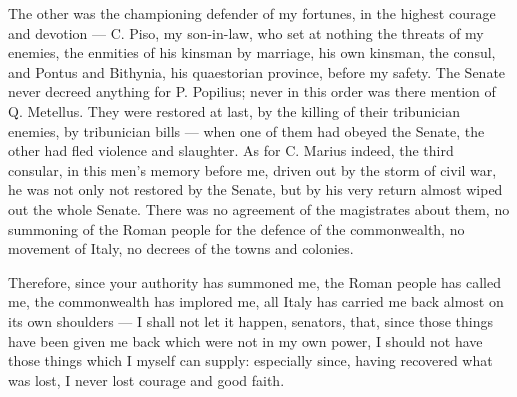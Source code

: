  The other was the championing defender of my fortunes, in the highest courage and devotion --- C. Piso, my son-in-law, who set at nothing the threats of my enemies, the enmities of his kinsman by marriage, his own kinsman, the consul, and Pontus and Bithynia, his quaestorian province, before my safety. The Senate never decreed anything for P. Popilius; never in this order was there mention of Q. Metellus. They were restored at last, by the killing of their tribunician enemies, by tribunician bills --- when one of them had obeyed the Senate, the other had fled violence and slaughter. As for C. Marius indeed, the third consular, in this men's memory before me, driven out by the storm of civil war, he was not only not restored by the Senate, but by his very return almost wiped out the whole Senate. There was no agreement of the magistrates about them, no summoning of the Roman people for the defence of the commonwealth, no movement of Italy, no decrees of the towns and colonies.

 Therefore, since your authority has summoned me, the Roman people has called me, the commonwealth has implored me, all Italy has carried me back almost on its own shoulders --- I shall not let it happen, senators, that, since those things have been given me back which were not in my own power, I should not have those things which I myself can supply: especially since, having recovered what was lost, I never lost courage and good faith.
